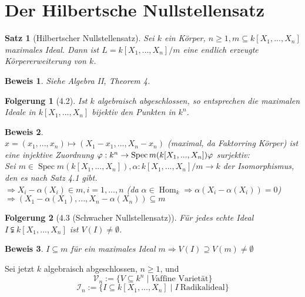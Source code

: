 \documentclass[a4paper,12pt]{report}
\theoremstyle{break}
\newtheorem{Satz}{Satz}
\theoremstyle{nonumberbreak}
\newtheorem{Bew}{Beweis}
\newtheorem{nnFolg}{Folgerung}
\theoremstyle{nonumberplain}
\begin{document}
\section{Der Hilbertsche Nullstellensatz}
\begin{Satz}[Hilbertscher Nullstellensatz]
Sei  $k$ ein Körper, $n\geq 1, m\subseteq k[X_1,...,X_n]$ maximales Ideal. Dann ist $L=k[X_1,...,X_n]/m$ eine endlich erzeugte Körpererweiterung von $k$.
\end{Satz}
\begin{Bew} Siehe Algebra II, Theorem 4. \end{Bew}
\begin{nnFolg}[4.2]
Ist $k$ algebraisch abgeschlossen, so entsprechen die maximalen Ideale in $k[X_1,...,X_n]$ bijektiv den Punkten in $k^n$.
\end{nnFolg}
\begin{Bew}~\\
$x=(x_1,...,x_n)\mapsto (X_1-x_1,...,X_n-x_n)$ (maximal, da Faktorring Körper) ist eine injektive Zuordnung $\varphi: k^n \rightarrow\operatorname{Spec}m(k[X_1,...,X_n])\\
\varphi$ surjektiv:\\
Sei $m\in\operatorname{Spec} m (k[X_1,...,X_n]), \alpha: k[X_1,...,X_n]/m \rightarrow k$ der Isomorphismus, den es nach Satz 4.1 gibt.\\
$\Rightarrow X_i - \alpha(X_i)\in m, i= 1,...,n$ (da $\alpha\in \operatorname{Hom}_k\Rightarrow \alpha(X_i-\alpha(X_i))=0$)\\
$\Rightarrow (X_1-\alpha(X_1),...,X_n-\alpha(X_n)) \subseteq m$
\end{Bew}
\begin{nnFolg}[4.3 (Schwacher Nullstellensatz)]
Für jedes echte Ideal $I\subsetneqq k[X_1,...,X_n]$ ist $V(I)\neq \emptyset$.
\end{nnFolg}
\begin{Bew}
$I\subseteq m$ für ein maximales Ideal $m \Rightarrow V(I) \supseteq V(m) \neq \emptyset$
\end{Bew}
Sei jetzt  $k$ algebraisch abgeschlossen, $n\geq 1$, und
$$\mathcal{V}_n:= \{V\subseteq k^n\mid V \textrm{affine~Varietät}\}$$
$$\mathcal{I}_n:=\{I\subseteq k[X_1,...,X_n]\mid I ~ \textrm{Radikalideal}\}$$
\end{document}
